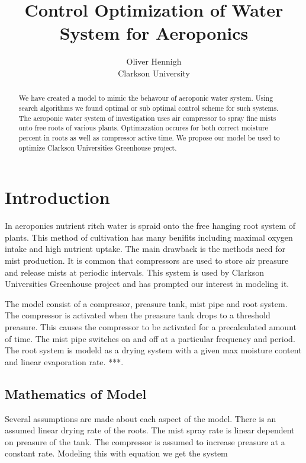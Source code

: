 \documentclass[a4paper,12pt]{article}
\begin{document}
\title{Control Optimization of Water System for Aeroponics}
\author{Oliver Hennigh \\
Clarkson University}
\renewcommand{\today}{}

\maketitle

\newtheorem*{t1}{Theorem}
\newtheorem*{t3}{Lemma}
\newtheorem*{t2}{Definition}

\begin{abstract}
We have created a model to mimic the behavour of aeroponic water system. Using search algorithms we found optimal or sub optimal control scheme for such systems. The aeroponic water system of investigation uses air compressor to spray fine mists onto free roots of various plants. Optimazation occures for both correct moisture percent in roots as well as compressor active time. We propose our model be used to optimize Clarkson Universities Greenhouse project.
\end{abstract}


\section{Introduction}

In aeroponics nutrient ritch water is spraid onto the free hanging root system of plants. This method of cultivation has many benifits including maximal oxygen intake and high nutrient uptake. The main drawback is the methods need for mist production. It is common that compressors are used to store air preasure and release mists at periodic intervals. This system is used by Clarkson Universities Greenhouse project and has prompted our interest in modeling it. 

The model consist of a compressor, preasure tank, mist pipe and root system. The compressor is activated when the preasure tank drops to a threshold preasure. This causes the compressor to be activated for a precalculated amount of time. The mist pipe switches on and off at a particular frequency and period. The root system is modeld as a drying system with a given max moisture content and linear evaporation rate. ***.

\subsection{Mathematics of Model}
Several assumptions are made about each aspect of the model. There is an assumed linear drying rate of the roots. The mist spray rate is linear dependent on preasure of the tank. The compressor is assumed to increase preasure at a constant rate. Modeling this with equation we get the system
\end{document}
